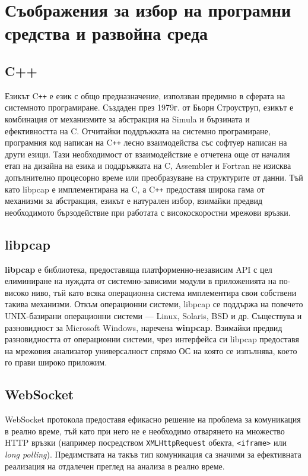 \documentclass[12pt,a4paper,oneside]{book}
\begin{document}
\section{Съображения за избор на програмни средства и развойна среда}

\subsection{C++}

Езикът C\texttt{++} е език с общо предназначение, използван предимно в сферата на
системното програмиране. Създаден през 1979г. от Бьорн Строуструп, езикът е
комбинация от механизмите за абстракция на Simula и бързината и
ефективността на C. Отчитайки поддръжката на системно програмиране,
програмния код написан на C\texttt{++} лесно взаимодейства със софтуер написан
на други езици. Тази необходимост от взаимодействие е отчетена още от началия
етап на дизайна на езика и поддръжката на C, Assembler и Fortran не изисква
допълнително процесорно време или преобразуване на структурите от данни.
\cite{stroustrup_c++_2013} Тъй като libpcap е имплементирана на C,
а C\texttt{++} предоставя широка гама от механизми за абстракция, езикът е натурален
избор, взимайки предвид
необходимото бързодействие при работата с високоскоростни мрежови връзки.

\subsection{libpcap}

\textbf{libpcap} е библиотека, предоставяща платформенно-независим API с цел
елиминиране на нуждата от системно-зависими модули в приложенията на по-високо
ниво, тъй като всяка операционна система имплементира свои собствени такива
механизми. Откъм операционни системи, libpcap се поддържа на повечето UNIX-базирани
операционни системи --- Linux, Solaris, BSD и др. Съществува и разновидност за
Microsoft Windows, наречена \textbf{winpcap}. Взимайки предвид разновидността от
операционни системи, чрез интерфейса си libpcap предоставя на мрежовия анализатор
универсалност спрямо ОС на която се изпълнява, което го прави широко приложим.

\subsection{WebSocket}

WebSocket протокола предоставя ефикасно решение на проблема за комуникация в
реално време,  тъй като при него не е необходимо отварянето на множество HTTP връзки
(например посредством \texttt{XMLHttpRequest} обекта, \texttt{<iframe>} или
\textit{long polling}). Предимствата на такъв тип комуникация са значими за
ефективната реализация на отдалечен преглед на анализа в реално време.
\end{document}
